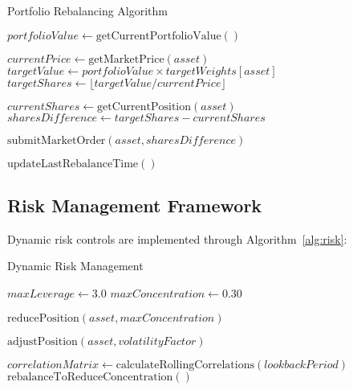\documentclass[11pt]{IEEEtran}
\begin{document}
\begin{algorithm}
\caption{Portfolio Rebalancing Algorithm}
\label{alg:rebalance}
\begin{algorithmic}[1]
        \State \Return {}
    \EndIf
    
    \State $portfolioValue \gets \text{getCurrentPortfolioValue}()$
    
        \State $currentPrice \gets \text{getMarketPrice}(asset)$
        \State $targetValue \gets portfolioValue \times targetWeights[asset]$
        \State $targetShares \gets \lfloor targetValue / currentPrice \rfloor$
        
        \State $currentShares \gets \text{getCurrentPosition}(asset)$
        \State $sharesDifference \gets targetShares - currentShares$
        
            \State $\text{submitMarketOrder}(asset, sharesDifference)$
        \EndIf
    \EndFor
    
    \State $\text{updateLastRebalanceTime}()$
\EndFunction
\end{algorithmic}
\end{algorithm}

\subsection{Risk Management Framework}

Dynamic risk controls are implemented through Algorithm~\ref{alg:risk}:

\begin{algorithm}
\caption{Dynamic Risk Management}
\label{alg:risk}
\begin{algorithmic}[1]
    \State $maxLeverage \gets 3.0$
    \State $maxConcentration \gets 0.30$
    
            \State $\text{reducePosition}(asset, maxConcentration)$
        \EndIf
        
            \State $\text{adjustPosition}(asset, volatilityFactor)$
        \EndIf
    \EndFor
    
    \State $correlationMatrix \gets \text{calculateRollingCorrelations}(lookbackPeriod)$
        \State $\text{rebalanceToReduceConcentration}()$
    \EndIf
\EndFunction
\end{algorithmic}
\end{algorithm}
\end{document}
